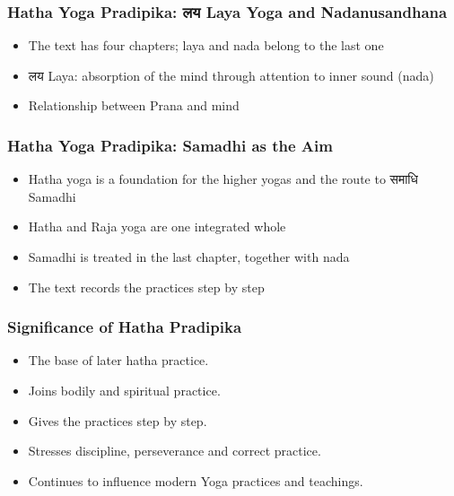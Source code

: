 \begin{frame}[fragile]\frametitle{Hatha Yoga Pradipika: लय  Laya Yoga and Nadanusandhana}
\begin{itemize}
    \item The text has four chapters; laya and nada belong to the last one
    \item लय  Laya: absorption of the mind through attention to inner sound (nada)
    \item Relationship between Prana and mind
\end{itemize}
\end{frame}

\begin{frame}[fragile]\frametitle{Hatha Yoga Pradipika: Samadhi as the Aim}
\begin{itemize}
    \item Hatha yoga is a foundation for the higher yogas and the route to समाधि Samadhi
    \item Hatha and Raja yoga are one integrated whole
    \item Samadhi is treated in the last chapter, together with nada
    \item The text records the practices step by step
\end{itemize}
\end{frame}

\begin{frame}[fragile]\frametitle{Significance of Hatha Pradipika}

      \begin{itemize}
		\item The base of later hatha practice.
		\item Joins bodily and spiritual practice.
		\item Gives the practices step by step.
		\item Stresses discipline, perseverance and correct practice.
		\item Continues to influence modern Yoga practices and teachings.
	  \end{itemize}

\end{frame}



